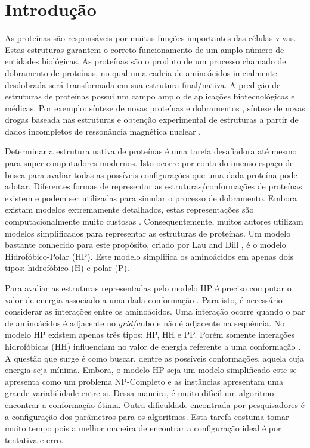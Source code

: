 \chapter{Introdução}

As proteínas são responsáveis por muitas funções importantes das células vivas. Estas estruturas garantem o correto funcionamento de um amplo número de entidades biológicas. As proteínas são o produto de um processo chamado de dobramento de proteínas, no qual uma cadeia de aminoácidos inicialmente desdobrada será transformada em sua estrutura final/nativa. A predição de estruturas de proteínas possui um campo amplo de aplicações biotecnológicas e médicas. Por exemplo: síntese de novas proteínas e dobramentos \cite{wang2012structural, rothlisberger2008kemp}, síntese de novas drogas baseada nas estruturas \cite{qian2004improvement, krieger2009improving}  e obtenção experimental de estruturas a partir de dados incompletos de ressonância magnética nuclear \cite{shen2009novo}.  

Determinar a estrutura nativa de proteínas é uma tarefa desafiadora até mesmo para super computadores modernos. Isto ocorre por conta do imenso espaço de busca para avaliar todas as possíveis configurações que uma dada proteína pode adotar. Diferentes formas de representar as estruturas/conformações de proteínas existem e podem ser utilizadas para simular o processo de dobramento. Embora existam modelos extremamente detalhados, estas representações são computacionalmente muito custosas \cite{benitez2015algoritmo, santana2008protein}. Consequentemente, muitos autores \cite{custodio2004investigation,hsu2003growth,lin2011protein,unger1993genetic,santanna2008,custodio2014multiple, garza2012locality} utilizam modelos simplificados para representar as estruturas de proteínas. Um modelo bastante conhecido para este propósito, criado por Lau and Dill \cite{lau1989lattice}, é o modelo Hidrofóbico-Polar (HP). Este modelo simplifica os aminoácidos em apenas dois tipos: hidrofóbico (H) e polar (P). 

Para avaliar as estruturas representadas pelo modelo HP é preciso computar o valor de energia associado a uma dada conformação \cite{unger1993genetic}. Para isto, é necessário considerar as interações entre os aminoácidos. Uma interação ocorre quando o par de aminoácidos é adjacente no \textit{grid}/cubo e não é adjacente na sequência. No modelo HP existem apenas três tipos: HP, HH e PP. Porém somente interações hidrofóbicas (HH) influenciam no valor de energia referente a uma conformação \cite{unger1993genetic}. A questão que surge é como buscar, dentre as possíveis conformações, aquela cuja energia seja mínima. Embora, o modelo HP seja um modelo simplificado este se apresenta como um problema NP-Completo e as instâncias apresentam uma grande variabilidade entre si. Dessa maneira, é muito difícil um algoritmo encontrar a conformação ótima. Outra dificuldade encontrada por pesquisadores é a configuração dos parâmetros para os algoritmos. Esta tarefa costuma tomar muito tempo pois a melhor maneira de encontrar a configuração ideal é por tentativa e erro.

